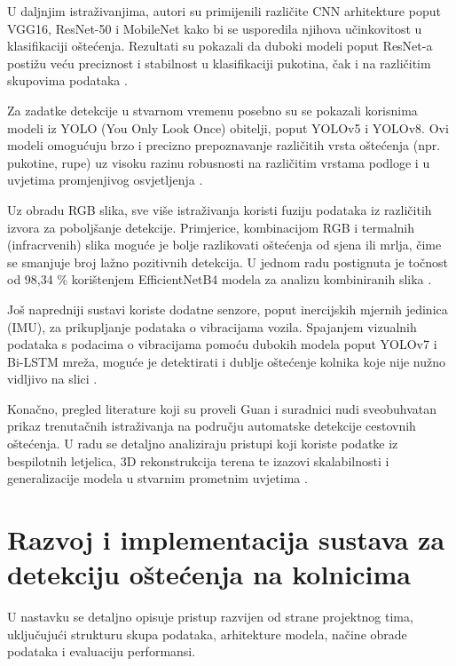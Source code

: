 \documentclass[conference]{IEEEtran}
\begin{document}
U daljnjim istraživanjima, autori su primijenili različite CNN arhitekture poput VGG16, ResNet-50 i MobileNet kako bi se usporedila njihova učinkovitost u klasifikaciji oštećenja. Rezultati su pokazali da duboki modeli poput ResNet-a postižu veću preciznost i stabilnost u klasifikaciji pukotina, čak i na različitim skupovima podataka \cite{tapamo2023}.

Za zadatke detekcije u stvarnom vremenu posebno su se pokazali korisnima modeli iz YOLO (You Only Look Once) obitelji, poput YOLOv5 i YOLOv8. Ovi modeli omogućuju brzo i precizno prepoznavanje različitih vrsta oštećenja (npr. pukotine, rupe) uz visoku razinu robusnosti na različitim vrstama podloge i u uvjetima promjenjivog osvjetljenja \cite{nafaa2024}.

Uz obradu RGB slika, sve više istraživanja koristi fuziju podataka iz različitih izvora za poboljšanje detekcije. Primjerice, kombinacijom RGB i termalnih (infracrvenih) slika moguće je bolje razlikovati oštećenja od sjena ili mrlja, čime se smanjuje broj lažno pozitivnih detekcija. U jednom radu postignuta je točnost od 98,34 \% korištenjem EfficientNetB4 modela za analizu kombiniranih slika \cite{mdpi2022}.

Još napredniji sustavi koriste dodatne senzore, poput inercijskih mjernih jedinica (IMU), za prikupljanje podataka o vibracijama vozila. Spajanjem vizualnih podataka s podacima o vibracijama pomoću dubokih modela poput YOLOv7 i Bi-LSTM mreža, moguće je detektirati i dublje oštećenje kolnika koje nije nužno vidljivo na slici \cite{hsieh2024}.

Konačno, pregled literature koji su proveli Guan i suradnici nudi sveobuhvatan prikaz trenutačnih istraživanja na području automatske detekcije cestovnih oštećenja. U radu se detaljno analiziraju pristupi koji koriste podatke iz bespilotnih letjelica, 3D rekonstrukcija terena te izazovi skalabilnosti i generalizacije modela u stvarnim prometnim uvjetima \cite{guan2023}.


\section{Razvoj i implementacija sustava za detekciju oštećenja na kolnicima}
\label{pog:razvoj}

U nastavku se detaljno opisuje pristup razvijen od strane projektnog tima, uključujući strukturu skupa podataka, arhitekture modela, načine obrade podataka i evaluaciju performansi.
\end{document}
